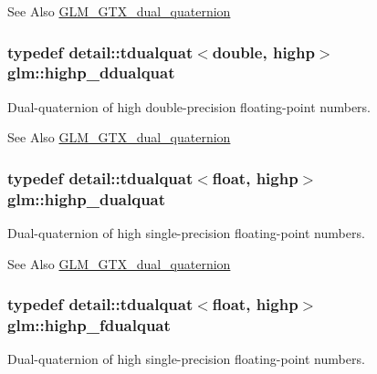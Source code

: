 \begin{DoxySeeAlso}{See Also}
\hyperlink{group__gtc__dual__quaternion}{G\-L\-M\-\_\-\-G\-T\-X\-\_\-dual\-\_\-quaternion} 
\end{DoxySeeAlso}
\hypertarget{group__gtc__dual__quaternion_ga61b654c21f080135aedcf23461eb1037}{
\subsubsection[{highp\-\_\-ddualquat}]{\setlength{\rightskip}{0pt plus 5cm}typedef detail\-::tdualquat$<$double, highp$>$ {\bf glm\-::highp\-\_\-ddualquat}}}\label{group__gtc__dual__quaternion_ga61b654c21f080135aedcf23461eb1037}
Dual-\/quaternion of high double-\/precision floating-\/point numbers.

\begin{DoxySeeAlso}{See Also}
\hyperlink{group__gtc__dual__quaternion}{G\-L\-M\-\_\-\-G\-T\-X\-\_\-dual\-\_\-quaternion} 
\end{DoxySeeAlso}
\hypertarget{group__gtc__dual__quaternion_gaf3a01deb502f53ca555ee1d45e6d6776}{
\subsubsection[{highp\-\_\-dualquat}]{\setlength{\rightskip}{0pt plus 5cm}typedef detail\-::tdualquat$<$float, highp$>$ {\bf glm\-::highp\-\_\-dualquat}}}\label{group__gtc__dual__quaternion_gaf3a01deb502f53ca555ee1d45e6d6776}
Dual-\/quaternion of high single-\/precision floating-\/point numbers.

\begin{DoxySeeAlso}{See Also}
\hyperlink{group__gtc__dual__quaternion}{G\-L\-M\-\_\-\-G\-T\-X\-\_\-dual\-\_\-quaternion} 
\end{DoxySeeAlso}
\hypertarget{group__gtc__dual__quaternion_ga2ed3283c09d3ffaf52a0e0a4b248eab6}{
\subsubsection[{highp\-\_\-fdualquat}]{\setlength{\rightskip}{0pt plus 5cm}typedef detail\-::tdualquat$<$float, highp$>$ {\bf glm\-::highp\-\_\-fdualquat}}}\label{group__gtc__dual__quaternion_ga2ed3283c09d3ffaf52a0e0a4b248eab6}
Dual-\/quaternion of high single-\/precision floating-\/point numbers.

